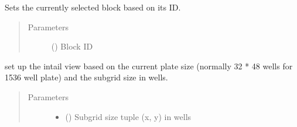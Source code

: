 \documentclass[letterpaper,10pt,english]{sphinxmanual}
\begin{document}
\begin{fulllineitems}
\begin{fulllineitems}
\label{\detokenize{polo.widgets:polo.widgets.plate_visualizer.PlateVisualizer.selected_brush}}
\end{fulllineitems}


\begin{fulllineitems}
\label{\detokenize{polo.widgets:polo.widgets.plate_visualizer.PlateVisualizer.set_selected_block}}
Sets the currently selected block based on its ID.
\begin{quote}\begin{description}
\item[{Parameters}] \leavevmode
{} () \textendash{} Block ID

\end{description}\end{quote}

\end{fulllineitems}


\begin{fulllineitems}
\label{\detokenize{polo.widgets:polo.widgets.plate_visualizer.PlateVisualizer.setup_view}}
set up the intail view based on the current plate
size (normally 32 * 48 wells for 1536 well plate) and
the subgrid size in wells.
\begin{quote}\begin{description}
\item[{Parameters}] \leavevmode\begin{itemize}
\item {} 
 () \textendash{} Subgrid size tuple (x, y) in wells


\end{itemize}
\end{description}
\end{quote}
\end{fulllineitems}
\end{fulllineitems}
\end{document}
